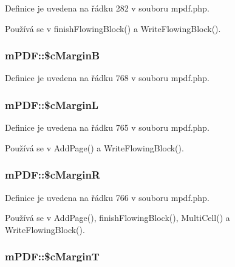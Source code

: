 Definice je uvedena na řádku 282 v souboru mpdf.\-php.



Používá se v finish\-Flowing\-Block() a Write\-Flowing\-Block().

\hypertarget{classm_p_d_f_a54e841b0df6f251c9dd1fb5e30593dea}{
\subsubsection[{\$c\-Margin\-B}]{\setlength{\rightskip}{0pt plus 5cm}m\-P\-D\-F\-::\$c\-Margin\-B}}\label{classm_p_d_f_a54e841b0df6f251c9dd1fb5e30593dea}


Definice je uvedena na řádku 768 v souboru mpdf.\-php.

\hypertarget{classm_p_d_f_a129d3b9f1e6a9561d772c248d0ec2331}{
\subsubsection[{\$c\-Margin\-L}]{\setlength{\rightskip}{0pt plus 5cm}m\-P\-D\-F\-::\$c\-Margin\-L}}\label{classm_p_d_f_a129d3b9f1e6a9561d772c248d0ec2331}


Definice je uvedena na řádku 765 v souboru mpdf.\-php.



Používá se v Add\-Page() a Write\-Flowing\-Block().

\hypertarget{classm_p_d_f_a5ab80bbda35ea69092e5f4df62a1ff6d}{
\subsubsection[{\$c\-Margin\-R}]{\setlength{\rightskip}{0pt plus 5cm}m\-P\-D\-F\-::\$c\-Margin\-R}}\label{classm_p_d_f_a5ab80bbda35ea69092e5f4df62a1ff6d}


Definice je uvedena na řádku 766 v souboru mpdf.\-php.



Používá se v Add\-Page(), finish\-Flowing\-Block(), Multi\-Cell() a Write\-Flowing\-Block().

\hypertarget{classm_p_d_f_a66692bdd1a8e34b087189342f584bff1}{
\subsubsection[{\$c\-Margin\-T}]{\setlength{\rightskip}{0pt plus 5cm}m\-P\-D\-F\-::\$c\-Margin\-T}}\label{classm_p_d_f_a66692bdd1a8e34b087189342f584bff1}


